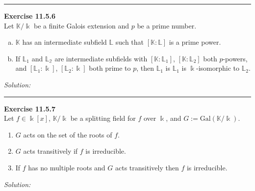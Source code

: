 \documentclass[a4paper, 12pt]{article}
\newenvironment{problem}[2][Exercise]
    { \begin{mdframed}[backgroundcolor=gray!20] \textbf{#1 #2} \\}
    {  \end{mdframed}}
\newenvironment{solution}
    {\textit{Solution:}}
    {}
\newcommand{\Gal}{\text{Gal}}
\begin{document}
\noindent\rule{7in}{2.8pt}
\begin{problem}{11.5.6}
Let \(\mathbb{K}/\Bbbk\) be a finite Galois extension and \(p\) be a prime number. 
\begin{enumerate}[(a)]
\item \(\mathbb{K}\) has an intermediate subfield \(\mathbb{L}\) such that \([\mathbb{K}:\mathbb{L}]\) is a prime power. 
\item If \(\mathbb{L}_1\) and \(\mathbb{L_2}\) are intermediate subfields with \([\mathbb{K}:\mathbb{L}_1]\), \([\mathbb{K}:\mathbb{L}_2]\) both 
\(p\)-powers, and \([\mathbb{L}_1:\Bbbk]\), \([\mathbb{L}_2:\Bbbk]\) both prime to \(p\), then \(\mathbb{L}_1\) is \(\mathbb{L}_1\) is \(\Bbbk\)-isomorphic to \(\mathbb{L}_2\).
\end{enumerate}
\end{problem}
\begin{solution}
    
\end{solution}

\noindent\rule{7in}{2.8pt}
\begin{problem}{11.5.7}
Let \(f\in \Bbbk[x]\), \(\mathbb{K}/\Bbbk\) be a splitting field for \(f\) over \(\Bbbk\), and \(G:=\Gal(\mathbb{K}/\Bbbk)\).
\begin{enumerate}
\item \(G\) acts on the set of the roots of \(f\).
\item \(G\) acts transitively if \(f\) is irreducible. 
\item If \(f\) has no multiple roots and \(G\) acts transitively then \(f\) is irreducible.
\end{enumerate}
\end{problem}
\begin{solution}
    
\end{solution}
\end{document}
